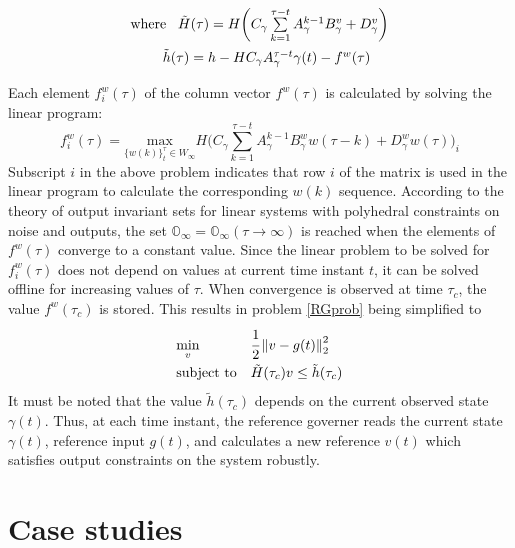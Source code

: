 \documentclass[letterpaper, 10 pt, conference]{ieeeconf}  %
\newcommand{\norm}[1]{\left\lVert#1\right\rVert}
\begin{document}
\begin{enumerate}
\begin{equation*}
\begin{matrix}
	\text{where } \hspace{5pt} \tilde{H}(\tau) = H\bigg( C_{\gamma}\sum\limits_{k=1}^{\tau - t}A_{\gamma}^{k-1}B^v_{\gamma} + D_{\gamma}^v \bigg) \vspace{5pt} \\ \hspace{10pt}
	\tilde{h}(\tau) = h - HC_{\gamma}A_{\gamma}^{\tau - t}\gamma(t) - f^w(\tau) \vspace{5pt}
	\end{matrix} 
	\end{equation*}
	Each element $f^w_i(\tau)$ of the column vector $f^w(\tau)$ is calculated by solving the linear program:
	\begin{equation*}
	f_i^w(\tau) = \underset{\{w(k)\}_{t}^{\tau}\in W_{\infty}}{\text{max}} H\bigg(C_{\gamma}\sum\limits_{k=1}^{\tau - t}A_{\gamma}^{k-1}B^w_{\gamma}w(\tau-k) + D_{\gamma}^w w(\tau)\bigg)_i
	\end{equation*}
	Subscript $i$ in the above problem indicates that row $i$ of the matrix is used in the linear program to calculate the corresponding $w(k)$ sequence. According to the theory of output invariant sets for linear systems with polyhedral constraints on noise and outputs, the set $\mathbb{O}_{\infty} = \mathbb{O}_{\infty}(\tau \to \infty)$ is reached when the elements of $f^w(\tau)$ converge to a constant value. Since the linear problem to be solved for $f_i^w(\tau)$ does not depend on values at current time instant $t$, it can be solved offline for increasing values of $\tau$. When convergence is observed at time $\tau_c$, the value $f^w(\tau_c)$ is stored. This results in  problem \eqref{RGprob} being simplified to
	\begin{equation}
	\begin{aligned}
	& \underset{v}{\text{min}}
	& & \cfrac{1}{2}\norm{v-g(t)}_2^2 \\
	& \text{subject to}
	& & 
	\tilde{H}(\tau_c)v \leq \tilde{h}(\tau_c)
	\end{aligned}
	\label{RGprob_simple}
	\end{equation}
	It must be noted that the value $\tilde{h}(\tau_c)$ depends on the current observed state $\gamma(t)$. Thus, at each time instant, the reference governer reads the current state $\gamma(t)$, reference input $g(t)$, and calculates a new reference $v(t)$ which satisfies output constraints on the system robustly.
	\section{Case studies}

\end{enumerate}
\end{document}
